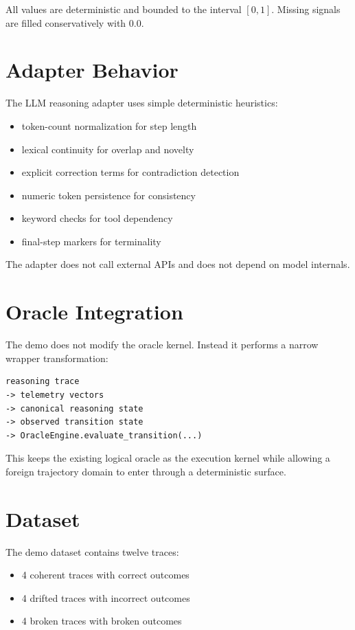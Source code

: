 \documentclass[11pt]{article}
\begin{document}
All values are deterministic and bounded to the interval $[0,1]$.
Missing signals are filled conservatively with $0.0$.

\section{Adapter Behavior}

The LLM reasoning adapter uses simple deterministic heuristics:

\begin{itemize}
\item token-count normalization for step length
\item lexical continuity for overlap and novelty
\item explicit correction terms for contradiction detection
\item numeric token persistence for consistency
\item keyword checks for tool dependency
\item final-step markers for terminality
\end{itemize}

The adapter does not call external APIs and does not depend on model internals.

\section{Oracle Integration}

The demo does not modify the oracle kernel.
Instead it performs a narrow wrapper transformation:

\begin{verbatim}
reasoning trace
-> telemetry vectors
-> canonical reasoning state
-> observed transition state
-> OracleEngine.evaluate_transition(...)
\end{verbatim}

This keeps the existing logical oracle as the execution kernel while allowing a foreign trajectory domain to enter through a deterministic surface.

\section{Dataset}

The demo dataset contains twelve traces:

\begin{itemize}
\item 4 coherent traces with correct outcomes
\item 4 drifted traces with incorrect outcomes
\item 4 broken traces with broken outcomes
\end{itemize}
\end{document}

